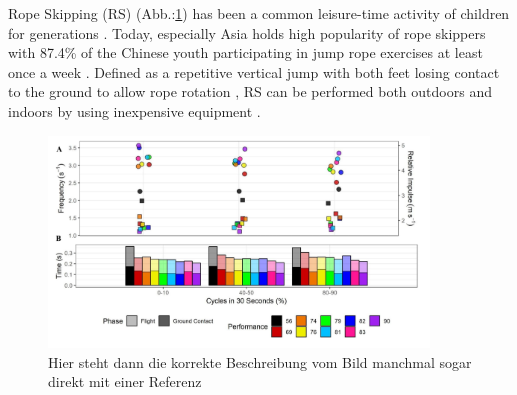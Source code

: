 Rope Skipping (RS) (Abb.:\ref{fig:Seilchenspringer}) has been a common leisure-time activity of children for generations \cite{gowitzke1989}. Today, especially Asia holds high popularity of rope skippers with 87.4\% of the Chinese youth participating in jump rope exercises at least once a week \cite{Li2013}. Defined as a repetitive vertical jump with both feet losing contact to the ground to allow rope rotation \cite{gowitzke1989}, RS can be performed both outdoors and indoors by using inexpensive equipment \cite{wong2004}.\\
\begin{figure} [h] \centering
\includegraphics[width=0.9\textwidth]{pix/fig3.png}
    \caption{Hier steht dann die korrekte Beschreibung vom Bild manchmal sogar direkt mit einer Referenz \cite{Li2013}}
    \label{fig:Seilchenspringer}
\end{figure}

